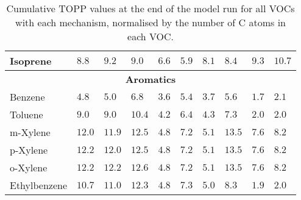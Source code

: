 {\begin{sidewaystable}
\begin{center}
\begin{tabular}{llllllllll}
                Isoprene & $8.8$ & $9.2$ & $9.0$ & $6.6$ & $5.9$ & $8.1$ & $8.4$ & $9.3$ & $10.7$ \\ \hline
                \multicolumn{10}{c}{\textbf{Aromatics}} \\ \hline 
                Benzene & $4.8$ & $5.0$ & $6.8$ & $3.6$ & $5.4$ & $3.7$ & $5.6$ & $1.7$ & $2.1$ \\
                Toluene & $9.0$ & $9.0$ & $10.4$ & $4.2$ & $6.4$ & $4.3$ & $7.3$ & $2.0$ & $2.0$ \\
                m-Xylene & $12.0$ & $11.9$ & $12.5$ & $4.8$ & $7.2$ & $5.1$ & $13.5$ & $7.6$ & $8.2$ \\
                p-Xylene & $12.2$ & $12.0$ & $12.5$ & $4.8$ & $7.2$ & $5.1$ & $13.5$ & $7.6$ & $8.2$ \\
                o-Xylene & $12.2$ & $12.2$ & $12.6$ & $4.8$ & $7.2$ & $5.1$ & $13.5$ & $7.6$ & $8.2$ \\
                Ethylbenzene & $10.7$ & $11.0$ & $12.3$ & $4.8$ & $7.3$ & $5.0$ & $8.3$ & $1.9$ & $2.0$ \\
                \hline \hline
            \end{tabular}%
            \caption{Cumulative TOPP values at the end of the model run for all VOCs with each mechanism, normalised by the number of C atoms in each VOC.}%
            \label{t:cumulative_TOPPs}%
        \end{center}%
    \end{sidewaystable}%
}
